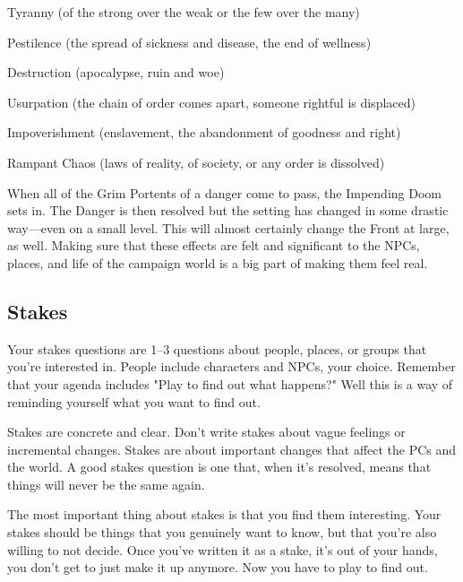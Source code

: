  
\startitemize[1,packed]

\item Tyranny (of the strong over the weak or the few over the many)

 
\item Pestilence (the spread of sickness and disease, the end of wellness)

 
\item Destruction (apocalypse, ruin and woe)

 
\item Usurpation (the chain of order comes apart, someone rightful is displaced)

 
\item Impoverishment (enslavement, the abandonment of goodness and right)

 
\item Rampant Chaos (laws of reality, of society, or any order is dissolved)


\stopitemize
 

When all of the Grim Portents of a danger come to pass, the Impending Doom sets in. The Danger is then resolved but the setting has changed in some drastic way—even on a small level. This will almost certainly change the Front at large, as well. Making sure that these effects are felt and significant to the NPCs, places, and life of the campaign world is a big part of making them feel real.

 
\subsection{Stakes}   
 

Your stakes questions are 1–3 questions about people, places, or groups that you're interested in. People include characters and NPCs, your choice. Remember that your agenda includes "Play to find out what happens?" Well this is a way of reminding yourself what you want to find out.

 

Stakes are concrete and clear. Don't write stakes about vague feelings or incremental changes. Stakes are about important changes that affect the PCs and the world. A good stakes question is one that, when it's resolved, means that things will never be the same again.

 

The most important thing about stakes is that you find them interesting. Your stakes should be things that you genuinely want to know, but that you're also willing to not decide. Once you've written it as a stake, it's out of your hands, you don't get to just make it up anymore. Now you have to play to find out.

